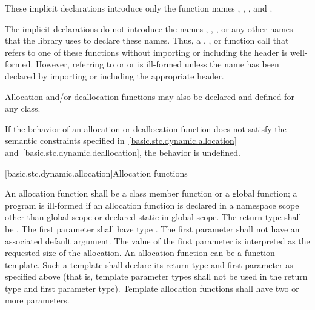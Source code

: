 These implicit declarations introduce only the function names
 ,  ,
 , and 
.
\begin{note}
The implicit declarations do not introduce
the names ,
,
,
or any other names that the library uses to
declare these names. Thus, a ,
, or function call that refers to one of
these functions without importing or including the header  is
well-formed. However, referring to 
or 
or 
is ill-formed unless the name has been declared
by importing or including the appropriate header.
\end{note}
Allocation and/or
deallocation functions may also be declared and defined for any
class.

\pnum
If the behavior of an allocation or deallocation function
does not satisfy the semantic constraints
specified in~\ref{basic.stc.dynamic.allocation}
and~\ref{basic.stc.dynamic.deallocation},
the behavior is undefined.

[basic.stc.dynamic.allocation]{Allocation functions}

\pnum
{}%
An allocation function shall be a class member function or a global
function; a program is ill-formed if an allocation function is declared
in a namespace scope other than global scope or declared static in
global scope. The return type shall be . The first
parameter shall have type . The
first parameter shall not have an associated default
argument. The value of the first parameter
is interpreted as the requested size of the allocation. An allocation
function can be a function template. Such a template shall declare its
return type and first parameter as specified above (that is, template
parameter types shall not be used in the return type and first parameter
type). Template allocation functions shall have two or more parameters.

